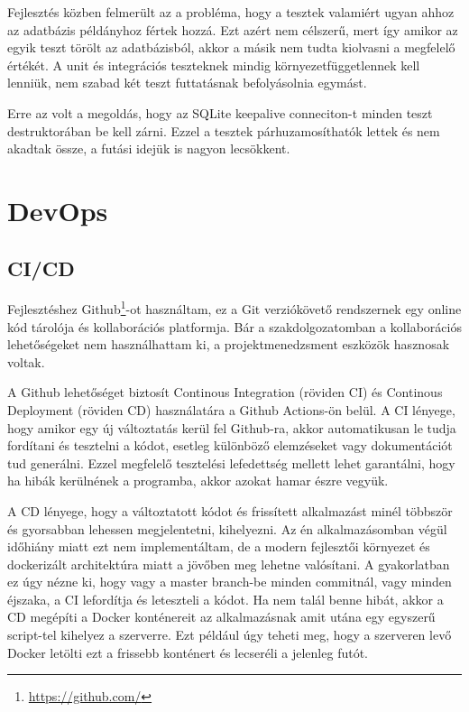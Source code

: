 Fejlesztés közben felmerült az a probléma, hogy a tesztek valamiért ugyan ahhoz az adatbázis példányhoz fértek hozzá. Ezt azért nem célszerű, mert így amikor az egyik teszt törölt az adatbázisból, akkor a másik nem tudta kiolvasni a megfelelő értékét. A unit és integrációs teszteknek mindig környezetfüggetlennek kell lenniük, nem szabad két teszt futtatásnak befolyásolnia egymást.

Erre az volt a megoldás, hogy az SQLite keepalive conneciton-t minden teszt destruktorában be kell zárni. Ezzel a tesztek párhuzamosíthatók lettek és nem akadtak össze, a futási idejük is nagyon lecsökkent.

\section{DevOps}
\subsection{CI/CD}
Fejlesztéshez Github\footnote{\url{https://github.com/}}-ot használtam, ez a Git verziókövető rendszernek egy online kód tárolója és kollaborációs platformja. Bár a szakdolgozatomban a kollaborációs lehetőségeket nem használhattam ki, a projektmenedzsment eszközök hasznosak voltak.

A Github lehetőséget biztosít Continous Integration (röviden CI) és Continous Deployment (röviden CD) használatára a Github Actions-ön belül. A CI lényege, hogy amikor egy új változtatás kerül fel Github-ra, akkor automatikusan le tudja fordítani és tesztelni a kódot, esetleg különböző elemzéseket vagy dokumentációt tud generálni. Ezzel megfelelő tesztelési lefedettség mellett lehet garantálni, hogy ha hibák kerülnének a programba, akkor azokat hamar észre vegyük.

A CD lényege, hogy a változtatott kódot és frissített alkalmazást minél többször és gyorsabban lehessen megjelentetni, kihelyezni. Az én alkalmazásomban végül időhiány miatt ezt nem implementáltam, de a modern fejlesztői környezet és dockerizált architektúra miatt a jövőben meg lehetne valósítani. A gyakorlatban ez úgy nézne ki, hogy vagy a master branch-be minden commitnál, vagy minden éjszaka, a CI lefordítja és leteszteli a kódot. Ha nem talál benne hibát, akkor a CD megépíti a Docker konténereit az alkalmazásnak amit utána egy egyszerű script-tel kihelyez a szerverre. Ezt például úgy teheti meg, hogy a szerveren levő Docker letölti ezt a frissebb konténert és lecseréli a jelenleg futót.

